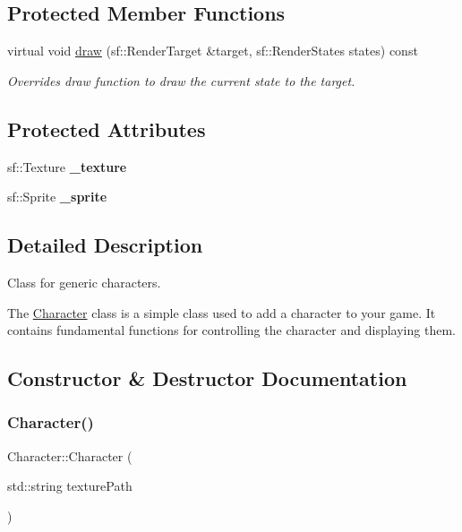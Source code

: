 \subsection*{Protected Member Functions}
\begin{DoxyCompactItemize}
\item 
virtual void \mbox{\hyperlink{class_character_a3812c72bf1cf8090f67a3387b5d96753}{draw}} (sf\+::\+Render\+Target \&target, sf\+::\+Render\+States states) const
\begin{DoxyCompactList}\small\item\em Overrides draw function to draw the current state to the target. \end{DoxyCompactList}\end{DoxyCompactItemize}
\subsection*{Protected Attributes}
\begin{DoxyCompactItemize}
\item 
\mbox{\label{class_character_ae924928a3fbea152f422fa0ba3e0f8e2}} 
sf\+::\+Texture {\bfseries \+\_\+texture}
\item 
\mbox{\label{class_character_ab3b89d967b817bc3e199ed70f6b6277a}} 
sf\+::\+Sprite {\bfseries \+\_\+sprite}
\end{DoxyCompactItemize}


\subsection{Detailed Description}
Class for generic characters. 

The \mbox{\hyperlink{class_character}{Character}} class is a simple class used to add a character to your game. It contains fundamental functions for controlling the character and displaying them. 

\subsection{Constructor \& Destructor Documentation}
\mbox{\label{class_character_a9c0bcc7f37b218c920d014bf722037fa}} 
\subsubsection{\texorpdfstring{Character()}{Character()}}
{\footnotesize\ttfamily Character\+::\+Character (\begin{DoxyParamCaption}\item[{std\+::string}]{texture\+Path }\end{DoxyParamCaption})}



